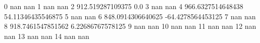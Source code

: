 0 nan nan
1 nan nan
2 912.519287109375 0.0
3 nan nan
4 966.6327514648438 54.11346435546875
5 nan nan
6 848.0914306640625 -64.4278564453125
7 nan nan
8 918.7461547851562 6.22686767578125
9 nan nan
10 nan nan
11 nan nan
12 nan nan
13 nan nan
14 nan nan
